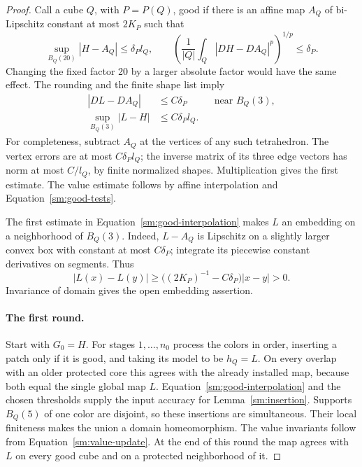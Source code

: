 \documentclass[11pt]{article}
\numberwithin{equation}{section}
\theoremstyle{definition}
\theoremstyle{remark}
\begin{document}
\begin{proof}
Call a cube $Q$, with $P=P(Q)$, good if there is an affine
map $A_Q$ of bi-Lipschitz constant at most $2K_P$ such that
\begin{equation}
 \label{sm:good-tests}
 \sup_{B_Q(20)}|H-A_Q|\le\delta_P l_Q,
 \qquad
 \left(\frac{1}{|Q|}\int_Q|DH-DA_Q|^p\right)^{1/p}\le\delta_P.
\end{equation}
Changing the fixed factor 20 by a larger absolute factor
would have the same effect.  The rounding and the finite
shape list imply
\begin{equation}
 \label{sm:good-interpolation}
 \begin{aligned}
 |DL-DA_Q|&\le C\delta_P
 &&\text{near }B_Q(3),\\
 \sup_{B_Q(3)}|L-H|&\le C\delta_P l_Q.
 \end{aligned}
\end{equation}
For completeness, subtract $A_Q$ at the vertices of any
such tetrahedron.  The vertex errors are at most
$C\delta_P l_Q$; the inverse matrix of its three edge
vectors has norm at most $C/l_Q$, by finite normalized
shapes.  Multiplication gives the first estimate.
The value estimate follows by affine interpolation
and Equation~\eqref{sm:good-tests}.

The first estimate in Equation~\eqref{sm:good-interpolation} makes
$L$ an embedding on a neighborhood of $B_Q(3)$.
Indeed, $L-A_Q$ is Lipschitz on a slightly larger convex
box with constant at most $C\delta_P$; integrate its
piecewise constant derivatives on segments.  Thus
\[
 |L(x)-L(y)|\ge
 \bigl((2K_P)^{-1}-C\delta_P\bigr)|x-y|>0.
\]
Invariance of domain gives the open embedding assertion.

\paragraph{The first round.}
Start with $G_0=H$.  For stages $1,\ldots,n_0$ process the
colors in order, inserting a patch only if it is good,
and taking its model to be $h_Q=L$.  On every overlap
with an older protected core this agrees with the
already installed map, because both equal the single
global map $L$.  Equation~\eqref{sm:good-interpolation}
and the chosen thresholds supply the input accuracy
for Lemma~\ref{sm:insertion}.  Supports $B_Q(5)$ of one
color are disjoint, so these insertions are simultaneous.
Their local finiteness makes the union a domain
homeomorphism.  The value invariants follow from
Equation~\eqref{sm:value-update}.  At the end of this round the
map agrees with $L$ on every good cube and on a
protected neighborhood of it.


\end{proof}
\end{document}
